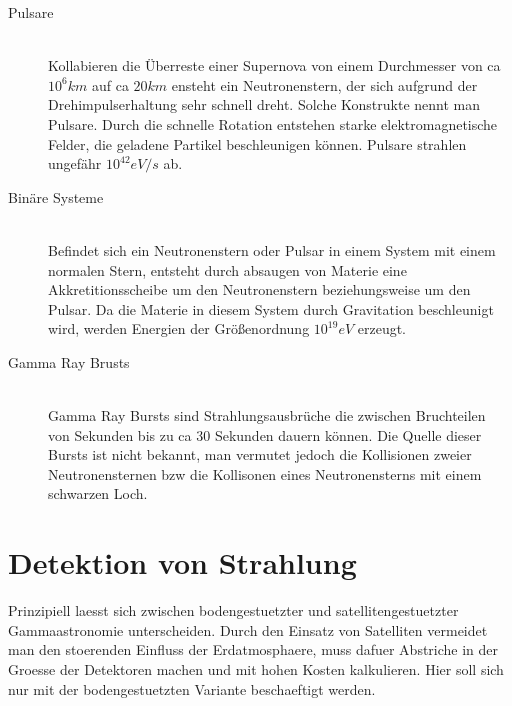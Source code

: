 \begin{description}
\item[Pulsare]\hfill \\
Kollabieren die Überreste einer Supernova von einem Durchmesser von ca $10^6km$ auf ca $20km$ ensteht ein Neutronenstern, der sich aufgrund der Drehimpulserhaltung sehr schnell dreht. Solche Konstrukte nennt man Pulsare. Durch die schnelle Rotation entstehen starke elektromagnetische Felder, die geladene Partikel beschleunigen können. Pulsare strahlen ungefähr $10^42eV/s$ ab.
\item[Binäre Systeme]\hfill \\ 
Befindet sich ein Neutronenstern oder Pulsar in einem System mit einem normalen Stern, entsteht durch absaugen von Materie eine Akkretitionsscheibe um den Neutronenstern beziehungsweise um den Pulsar. Da die Materie in diesem System durch Gravitation beschleunigt wird, werden Energien der Größenordnung $10^19 eV$ erzeugt. 
\item[Gamma Ray Brusts]\hfill \\
Gamma Ray Bursts sind Strahlungsausbrüche die zwischen Bruchteilen von Sekunden bis zu ca 30 Sekunden dauern können. Die Quelle dieser Bursts ist nicht bekannt, man vermutet jedoch die Kollisionen zweier Neutronensternen bzw die Kollisonen eines Neutronensterns mit einem schwarzen Loch.
\end{description}


\section{Detektion von Strahlung}
Prinzipiell laesst sich zwischen bodengestuetzter und satellitengestuetzter Gammaastronomie unterscheiden. Durch den Einsatz von Satelliten vermeidet man den stoerenden Einfluss der Erdatmosphaere, muss dafuer Abstriche in der Groesse der Detektoren machen und mit hohen Kosten kalkulieren. Hier soll sich nur mit der bodengestuetzten Variante beschaeftigt werden.

